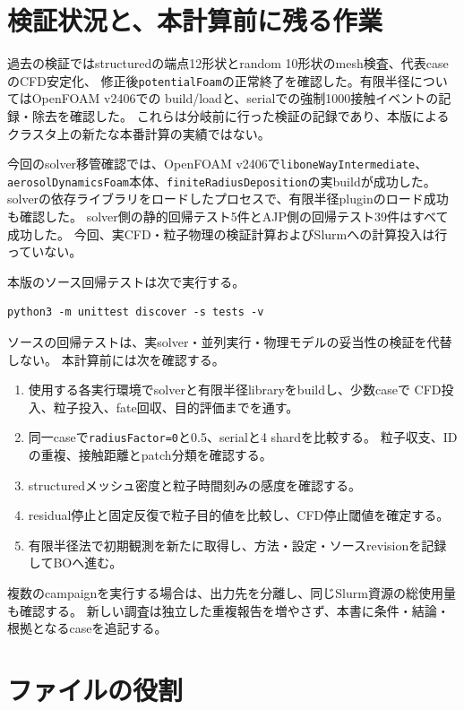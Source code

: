 \documentclass[a4paper,11pt]{article}
\newcommand{\code}[1]{\texttt{#1}}
\begin{document}
\section{検証状況と、本計算前に残る作業}

過去の検証ではstructuredの端点12形状とrandom 10形状のmesh検査、代表caseのCFD安定化、
修正後\code{potentialFoam}の正常終了を確認した。有限半径についてはOpenFOAM v2406での
build/loadと、serialでの強制1000接触イベントの記録・除去を確認した。
これらは分岐前に行った検証の記録であり、本版によるクラスタ上の新たな本番計算の実績ではない。

今回のsolver移管確認では、OpenFOAM v2406で\code{liboneWayIntermediate}、
\code{aerosolDynamicsFoam}本体、\code{finiteRadiusDeposition}の実buildが成功した。
solverの依存ライブラリをロードしたプロセスで、有限半径pluginのロード成功も確認した。
solver側の静的回帰テスト5件とAJP側の回帰テスト39件はすべて成功した。
今回、実CFD・粒子物理の検証計算およびSlurmへの計算投入は行っていない。

本版のソース回帰テストは次で実行する。
\begin{verbatim}
python3 -m unittest discover -s tests -v
\end{verbatim}
ソースの回帰テストは、実solver・並列実行・物理モデルの妥当性の検証を代替しない。
本計算前には次を確認する。

\begin{enumerate}
 \item 使用する各実行環境でsolverと有限半径libraryをbuildし、少数caseで
 CFD投入、粒子投入、fate回収、目的評価までを通す。
 \item 同一caseで\code{radiusFactor=0}と0.5、serialと4 shardを比較する。
 粒子収支、IDの重複、接触距離とpatch分類を確認する。
 \item structuredメッシュ密度と粒子時間刻みの感度を確認する。
 \item residual停止と固定反復で粒子目的値を比較し、CFD停止閾値を確定する。
 \item 有限半径法で初期観測を新たに取得し、方法・設定・ソースrevisionを記録してBOへ進む。
\end{enumerate}

複数のcampaignを実行する場合は、出力先を分離し、同じSlurm資源の総使用量も確認する。
新しい調査は独立した重複報告を増やさず、本書に条件・結論・根拠となるcaseを追記する。

\section{ファイルの役割}
\end{document}
